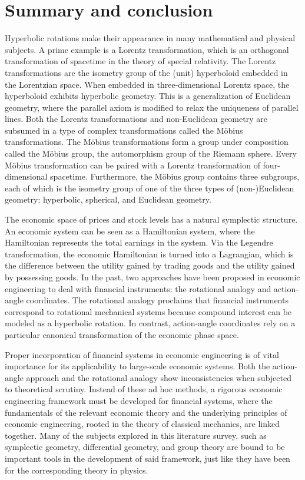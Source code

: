 \chapter{Summary and conclusion}
\label{chap:conclusion}

Hyperbolic rotations make their appearance in many mathematical and physical subjects. A prime example is a Lorentz transformation, which is an orthogonal transformation of spacetime in the theory of special relativity. The Lorentz transformations are the isometry group of the (unit) hyperboloid embedded in the Lorentzian space. When embedded in three-dimensional Lorentz space, the hyperboloid exhibits hyperbolic geometry. This is a generalization of Euclidean geometry, where the parallel axiom is modified to relax the uniqueness of parallel lines. Both the Lorentz transformations and non-Euclidean geometry are subsumed in a type of complex transformations called the Möbius transformations. The Möbius transformations form a group under composition called the Möbius group, the automorphism group of the Riemann sphere. Every Möbius transformation can be paired with a Lorentz transformation of four-dimensional spacetime. Furthermore, the Möbius group contains three subgroups, each of which is the isometry group of one of the three types of (non-)Euclidean geometry: hyperbolic, spherical, and Euclidean geometry.

The economic space of prices and stock levels has a natural symplectic structure. An economic system can be seen as a Hamiltonian system, where the Hamiltonian represents the total earnings in the system. Via the Legendre transformation, the economic Hamiltonian is turned into a Lagrangian, which is the difference between the utility gained by trading goods and the utility gained by possessing goods. In the past, two approaches have been proposed in economic engineering to deal with financial instruments: the rotational analogy and action-angle coordinates. The rotational analogy proclaims that financial instruments correspond to rotational mechanical systems because compound interest can be modeled as a hyperbolic rotation. In contrast, action-angle coordinates rely on a particular canonical transformation of the economic phase space.

Proper incorporation of financial systems in economic engineering is of vital importance for its applicability to large-scale economic systems. Both the action-angle approach and the rotational analogy show inconsistencies when subjected to theoretical scrutiny. Instead of these ad hoc methods, a rigorous economic engineering framework must be developed for financial systems, where the fundamentals of the relevant economic theory and the underlying principles of economic engineering, rooted in the theory of classical mechanics, are linked together. Many of the subjects explored in this literature survey, such as symplectic geometry, differential geometry, and group theory are bound to be important tools in the development of said framework, just like they have been for the corresponding theory in physics.

